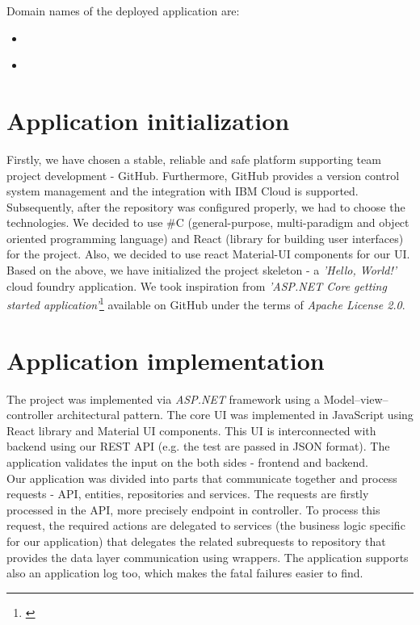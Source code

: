 \documentclass[11pt,a4paper]{article}
\begin{document}
Domain names of the deployed application are:
\begin{itemize}
    \item \href{https://pa181.eu-de.mybluemix.net/}{\color{urlColor}{pa181.eu-de.mybluemix.net}}
    \item \href{https://pa181.eu-de.cf.appdomain.cloud/}{\color{urlColor}{pa181.eu-de.cf.appdomain.cloud}}
\end{itemize}

\section{Application initialization}

Firstly, we have chosen a stable, reliable and safe platform supporting team project development - GitHub. Furthermore, GitHub provides a version control system management and the integration with IBM Cloud is supported. Subsequently, after the repository was configured properly, we had to choose the technologies. We decided to use \#C (general-purpose, multi-paradigm and object oriented programming language) and React (library for building user interfaces) for the project. Also, we decided to use react Material-UI components for our UI. Based on the above, we have initialized the project skeleton - a \textit{'Hello, World!'} cloud foundry application. We took inspiration from \textit{'ASP.NET Core getting started application'}\footnote{\href{https://github.com/IBM-Cloud/aspnet-core-helloworld}{\color{urlColor}{github.com/IBM-Cloud/aspnet-core-helloworld}}} available on GitHub under the terms of \textit{Apache License 2.0}.

\section{Application implementation}

The project was implemented via \textit{ASP.NET} framework using a Model--view--controller architectural pattern. The core UI was implemented in JavaScript using React library and Material UI components. This UI is interconnected with backend using our REST API (e.g. the test are passed in JSON format). The application validates the input on the both sides - frontend and backend.\\

Our application was divided into parts that communicate together and process requests - API, entities, repositories and services. The requests are firstly processed in the API, more precisely endpoint in controller. To process this request, the required actions are delegated to services (the business logic specific for our application) that delegates the related subrequests to repository that provides the data layer communication using wrappers. The application supports also an application log too, which makes the fatal failures easier to find.
\end{document}
